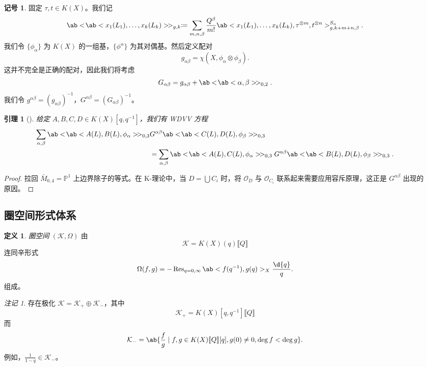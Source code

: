 \documentclass{amsart}
\newtheorem{lem}[thm]{引理}
\theoremstyle{definition}
\newtheorem{defn}[thm]{定义}
\newtheorem{notn}[thm]{记号}
\theoremstyle{remark}
\newtheorem{rmk}[thm]{注记}
\theoremstyle{plain}
\theoremstyle{definition}
\theoremstyle{remark}
\renewcommand{\P}{\mathbb{P}}
\newcommand{\mc}[1]{\mathcal{#1}}
\newcommand{\on}[1]{\operatorname{#1}}
\newcommand{\1}{\mathbf{1}}
\newcommand{\2}{\mathbf{2}}
\newcommand{\3}{\mathbf{3}}
\newcommand{\ps}[1]{\llbracket #1 \rrbracket}
\begin{document}
\begin{notn}
    固定 \(\tau, t \in K(X)\)。我们记
    \[ \ab<\!\ab<x_1(L_1), \ldots, x_k(L_k)>\!>_{g,k} \coloneqq \sum_{m,n,\beta} \frac{Q^{\beta}}{m!} \ab<x_1(L_1), \ldots, x_k(L_k), \tau^{\otimes m}, t^{\otimes n}>_{g,k+m+n,\beta}^{S_n}. \]
    我们令 \(\{\phi_{\alpha}\}\) 为 \(K(X)\) 的一组基，\(\{\phi^{\alpha}\}\) 为其对偶基。然后定义配对
    \[ g_{\alpha\beta} = \chi(X, \phi_{\alpha} \otimes \phi_{\beta}). \]
    这并不完全是正确的配对，因此我们将考虑
    \[ G_{\alpha\beta} = g_{\alpha\beta} + \ab<\!\ab<\alpha,\beta>\!>_{0,2}. \]
    我们令 \(g^{\alpha\beta} = (g_{\alpha\beta})^{-1}\)，\(G^{\alpha\beta} = (G_{\alpha\beta})^{-1}\)。
\end{notn}

\begin{lem}[{\cite{Givental2000K}}]
    给定 \(A,B,C,D \in K(X)[q,q^{-1}]\)，我们有 \textit{WDVV 方程}
    \begin{align*}
        \sum_{\alpha,\beta} \ab<\!\ab< A(L), B(L), \phi_{\alpha}>\! >_{0,3}& G^{\alpha\beta}\ab<\!\ab< C(L), D(L), \phi_{\beta}>\! >_{0,3} \\
        &= \sum_{\alpha,\beta} \ab<\!\ab< A(L), C(L), \phi_{\alpha}>\! >_{0,3} G^{\alpha\beta}\ab<\!\ab< B(L), D(L), \phi_{\beta}>\! >_{0,3}. 
    \end{align*}
\end{lem}

\begin{proof}
    拉回 \(\bar{M}_{0,4} = \P^1\) 上边界除子的等式。在 K-理论中，当 \(D = \bigcup C_i\) 时，将 \(\mc{O}_D\) 与 \(\mc{O}_{C_i}\) 联系起来需要应用容斥原理，这正是 \(G^{\alpha\beta}\) 出现的原因。
\end{proof}

\subsection{圈空间形式体系}%
\label{sub:Loop space formalism}

\begin{defn}
    \textit{圈空间} \((\mc{K}, \Omega)\) 由
    \[ \mc{K} = K(X)(q) \ps{Q}\]
    连同辛形式
    \[ \Omega(f, g) = - \on{Res}_{q = 0, \infty} \ab<f(q^{-1}), g(q)>_X \frac{\d{q}}{q}. \]
    组成。
\end{defn}

\begin{rmk}
    存在极化 \(\mc{K} = \mc{K}_+ \oplus \mc{K}_-\)，其中
    \[ \mc{K}_+ = K(X)[q, q^{-1}]\ps{Q} \]
    而
    \[ \mc{K}_- = \ab\{ \frac{f}{g} \mid f, g \in K(X)\ps{Q}[q], g(0) \neq 0, \deg f < \deg g\}. \]
    例如，\(\frac{1}{1-q} \in \mc{K}_-\)。
\end{rmk}
\end{document}
